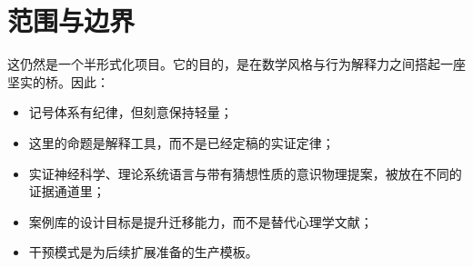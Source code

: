 \section{范围与边界}

这仍然是一个半形式化项目。它的目的，是在数学风格与行为解释力之间搭起一座坚实的桥。因此：
\begin{itemize}[nosep]
  \item 记号体系有纪律，但刻意保持轻量；
  \item 这里的命题是解释工具，而不是已经定稿的实证定律；
  \item 实证神经科学、理论系统语言与带有猜想性质的意识物理提案，被放在不同的证据通道里；
  \item 案例库的设计目标是提升迁移能力，而不是替代心理学文献；
  \item 干预模式是为后续扩展准备的生产模板。
\end{itemize}